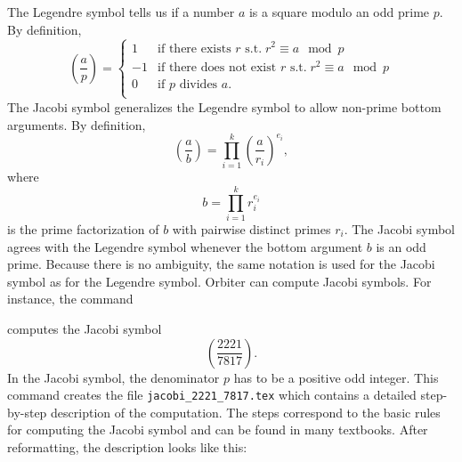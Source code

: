 The Legendre symbol tells us if a number $a$ is a square modulo an odd prime $p$. 
By definition,  
$$
\left(
\frac{a}{p}
\right) = 
\left\{
\begin{array}{cl}
	1 & \mbox{if there exists $r$ s.t.} \; r^2 \equiv a \mod p \\ 
	-1 & \mbox{if there does not exist $r$ s.t.} \; r^2 \equiv a \mod p \\ 
	0 & \mbox{if $p$ divides $a$.}\\
	\end{array}
\right.
$$
The Jacobi symbol 
generalizes the Legendre symbol to allow non-prime bottom arguments.
By definition,
$$
\left(
\frac{a}{b}
\right) 
= 
\prod_{i=1}^k 
\left(
\frac{a}{r_i}
\right)^{e_i},
$$
where 
$$
b = \prod_{i=1}^k r_i^{e_i}
$$
is the prime factorization of $b$ with pairwise distinct primes $r_i.$
The Jacobi symbol agrees with the Legendre symbol whenever the bottom argument $b$ is an odd prime.
Because there is no ambiguity, the same notation is used for the Jacobi symbol as for the Legendre symbol.
Orbiter can compute Jacobi symbols. 
For instance, the command 
{\tt

}
computes the Jacobi symbol 
$$
\left(
\frac{2221}{7817}
\right).
$$
In the Jacobi symbol, the denominator $p$ has to be a positive odd integer.
This command creates the file \verb'jacobi_2221_7817.tex' 
which contains a detailed step-by-step description 
of the computation. 
The steps correspond to the basic rules for computing the Jacobi symbol and can be found in many textbooks.
After reformatting, the description looks like this:

\begin{mdframed}[style=MyFrame]

\end{mdframed}

